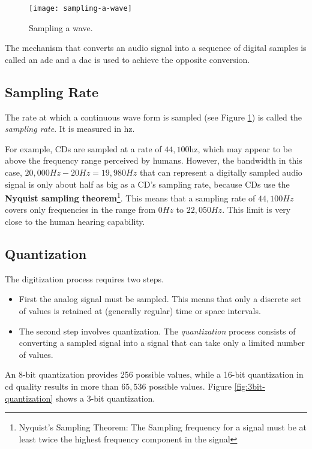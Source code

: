 
\begin{figure}[H]
	\centering
		\texttt{[image: sampling-a-wave]}
	\caption{Sampling a wave.}{\label{fig:wave-sampling}}
\end{figure}


The mechanism that converts an audio signal into a sequence of digital samples is called an \gls{adc} and a \gls{dac} is used to achieve the opposite conversion.

\subsection{Sampling Rate}
The rate at which a continuous wave form is sampled (see Figure {\ref{fig:wave-sampling}}) is called the \textit{sampling rate}. It is measured in \gls{hz}. 

For example, CDs are sampled at a rate of \(44,100\)\gls{hz}, which may appear to be above the frequency range perceived by humans. However, the bandwidth in this case, \(20,000Hz-20Hz = 19,980Hz\) that can represent a digitally sampled audio signal is only about half as big as a CD's sampling rate, because CDs use the \textbf{Nyquist sampling theorem}\footnote{Nyquist’s Sampling Theorem: The Sampling frequency for a signal must be at least twice
	the highest frequency component in the signal}. This means
that a sampling rate of $ 44,100Hz $ covers only frequencies in the range from $ 0Hz $ to
$ 22,050Hz $. This limit is very close to the human hearing capability.


\subsection{Quantization}
The digitization process requires two steps. 
\begin{itemize}
	\item First the analog signal must be sampled. This means that only a discrete set of values is retained at (generally regular) time
	or space intervals. 
	
	\item The second step involves quantization. The \textit{quantization} process consists of converting a sampled signal into a signal that can take only a limited number of values.
\end{itemize}
 
An 8-bit quantization provides 256 possible values, while a 16-bit quantization in \gls{cd} quality results in more than $ 65,536 $ possible values. Figure \ref{fig:3bit-quantization} shows a 3-bit quantization.

